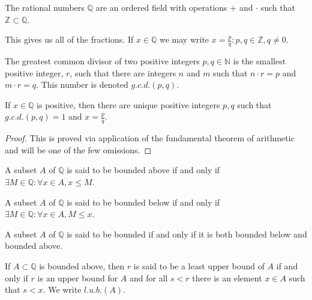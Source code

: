 \documentclass[crop=false,class=article,oneside]{standalone}
\begin{document}
            \begin{definition}
            The rational numbers $\mathbb{Q}$ are an ordered field with operations $+$ and $\cdot$ such that $\mathbb{Z}\subset \mathbb{Q}$.
            \end{definition}
            \begin{remark}
            This gives us all of the fractions. If $x\in \mathbb{Q}$ we may write $x= \frac{p}{q}:p,q\in \mathbb{Z}, q\ne 0$.
            \end{remark}
            \begin{definition}
            The greatest common divisor of two positive integers $p,q\in \mathbb{N}$ is the smallest positive integer, $r$, such that there are integers $n$ and $m$ such that $n\cdot r = p$ and $m\cdot r = q$. This number is denoted $g.c.d.(p,q)$.
            \end{definition}
            \begin{theorem}
            If $x\in \mathbb{Q}$ is positive, then there are unique positive integers $p, q$ such that $g.c.d.(p,q)=1$ and $x=\frac{p}{q}$.
            \end{theorem}
            \begin{proof}
            This is proved via application of the fundamental theorem of arithmetic and will be one of the few omissions.
            \end{proof}
            \begin{definition}
            A subset $A$ of $\mathbb{Q}$ is said to be bounded above if and only if $\exists M\in \mathbb{Q}: \forall x\in A,x \leq M$.
            \end{definition}
            \begin{definition}
            A subset $A$ of $\mathbb{Q}$ is said to be bounded below if and only if $\exists M\in \mathbb{Q}:\forall x\in A,M\leq x$. 
            \end{definition}
            \begin{definition}
            A subset $A$ of $\mathbb{Q}$ is said to be bounded if and only if it is both bounded below and bounded above.
            \end{definition}
            \begin{definition}
            If $A\subset \mathbb{Q}$ is bounded above, then $r$ is said to be a least upper bound of $A$ if and only if $r$ is an upper bound for $A$ and for all $s<r$ there is an element $x\in A$ such that $s<x$. We write $l.u.b.(A)$.
            \end{definition}
\end{document}

